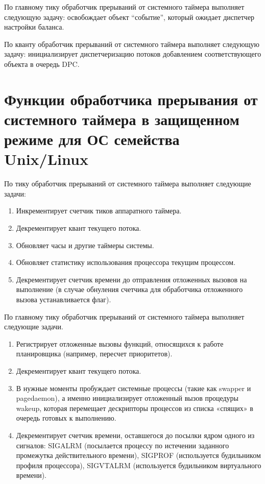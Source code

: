 \documentclass[12pt]{report}
\begin{document}
По главному тику обработчик прерываний от системного таймера выполняет следующую задачу: освобождает объект “событие”, который ожидает диспетчер настройки баланса.

По кванту обработчик прерываний от системного таймера выполняет следующую задачу: инициализирует диспетчеризацию потоков добавлением соответствующего объекта в очередь DPC.

\section{Функции обработчика прерывания от системного таймера в защищенном режиме для ОС семейства Unix/Linux}

По тику обработчик прерываний от системного таймера выполняет следующие задачи:
\begin{enumerate}
\item Инкрементирует счетчик тиков аппаратного таймера.
\item Декрементирует квант текущего потока.
\item Обновляет часы и другие таймеры системы.
\item Обновляет статистику использования процессора текущим процессом.
\item Декрементирует счетчик времени до отправления отложенных вызовов на выполнение (в случае обнуления счетчика для обработчика отложенного вызова устанавливается флаг).
\end{enumerate}

По главному тику обработчик прерываний от системного таймера выполняет следующие задачи.
\begin{enumerate}
\item Регистрирует отложенные вызовы функций, относящихся к работе планировщика (например, пересчет приоритетов).
\item Декрементирует квант текущего потока.
\item В нужные моменты пробуждает системные процессы (такие как swapper и pagedaemon), а именно инициализирует отложенный вызов процедуры wakeup, которая перемещает дескрипторы процессов из списка «спящих» в очередь готовых к выполнению.
\item Декрементирует счетчик времени, оставшегося до посылки ядром одного из сигналов: SIGALRM (посылается процессу по истечении заданного промежутка действительного времени), SIGPROF (используется будильником профиля процессора), SIGVTALRM (используется будильником виртуального времени).
\end{enumerate}
\end{document}
